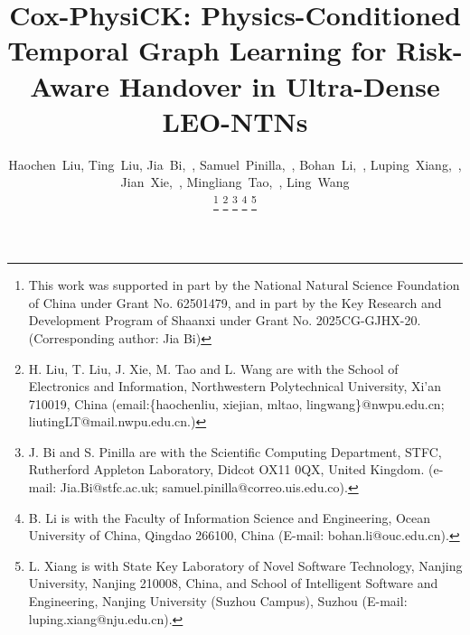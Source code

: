 \documentclass[10pt,letterpaper,journal]{IEEEtran}
\begin{document}

\title{Cox-PhysiCK: Physics-Conditioned Temporal Graph Learning for Risk-Aware Handover in Ultra-Dense LEO-NTNs}

\author{Haochen~Liu,
        Ting~Liu,
        Jia~Bi,~,
Samuel~Pinilla,~,
        Bohan~Li,~,
        Luping~Xiang,~,
        Jian~Xie,~,
        Mingliang~Tao,~,
        Ling~Wang
        
\thanks{This work was supported in part by the National Natural Science Foundation of China under Grant No. 62501479, and in part by the Key Research and Development Program of Shaanxi under Grant No. 2025CG-GJHX-20. (Corresponding author: Jia Bi)}
\thanks{H. Liu, T. Liu, J. Xie, M. Tao and L. Wang are with the School of Electronics and Information, Northwestern Polytechnical University, Xi'an 710019, China (email:\{haochenliu, xiejian, mltao, lingwang\}@nwpu.edu.cn; liutingLT@mail.nwpu.edu.cn.)}
\thanks{J. Bi and S. Pinilla are with the Scientific Computing Department, STFC, Rutherford Appleton Laboratory, Didcot OX11 0QX, United Kingdom. (e-mail: Jia.Bi@stfc.ac.uk; samuel.pinilla@correo.uis.edu.co).}
\thanks{B. Li is with the Faculty of Information Science and Engineering, Ocean University of China, Qingdao 266100, China (E-mail: bohan.li@ouc.edu.cn).}
\thanks{L. Xiang is with State Key Laboratory of Novel Software Technology, Nanjing University, Nanjing 210008, China, and School of Intelligent Software and Engineering, Nanjing University (Suzhou Campus), Suzhou (E-mail: luping.xiang@nju.edu.cn).}}

\end{document}
